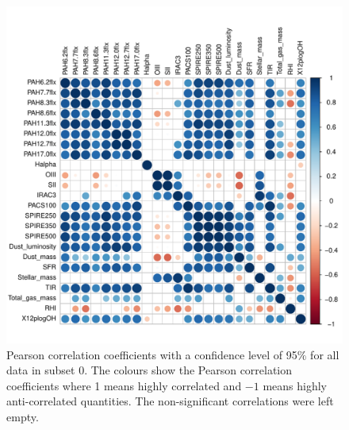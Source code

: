     
      \begin{figure}
                \centering
                \includegraphics[width=\textwidth]{../images0.01/cor_plots/M31_all_derived_ones_core_plot_for_paper.pdf}
            \caption{Pearson correlation coefficients with a confidence level of 95$\%$ for all data in subset 0. The colours show the Pearson correlation coefficients where 1 means highly correlated and $-1$ means highly anti-correlated quantities. The non-significant correlations were left empty.}
            \label{fig: cor_all}
        \end{figure}
 
  
